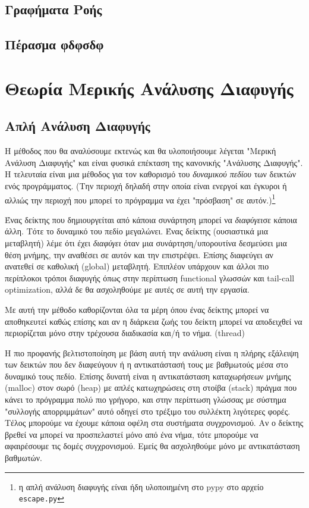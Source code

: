 \subsection{Γραφήματα Ροής}
\subsection{Πέρασμα φδφσδφ}


\section{Θεωρία Μερικής Ανάλυσης Διαφυγής}


\subsection{Απλή Ανάλυση Διαφυγής}

Η μέθοδος που θα αναλύσουμε εκτενώς και θα υλοποιήσουμε λέγεται "Μερική
Ανάλυση Διαφυγής" και είναι φυσικά επέκταση της κανονικής "Ανάλυσης Διαφυγής".
Η τελευταία είναι μια μέθοδος για τον καθορισμό του \textit{δυναμικού πεδίου}
των δεικτών ενός προγράμματος. (Την περιοχή δηλαδή στην οποία είναι ενεργοί
και έγκυροι ή αλλιώς την περιοχή που μπορεί το πρόγραμμα να έχει "πρόσβαση" σε
αυτόν.)\footnote{η απλή ανάλυση διαφυγής είναι ήδη υλοποιημένη στο pypy στο
αρχείο \texttt{escape.py}}

Ένας δείκτης που δημιουργείται από κάποια συνάρτηση μπορεί να
\textit{διαφύγει}σε κάποια άλλη. Τότε το δυναμικό του πεδίο μεγαλώνει. Ένας
δείκτης (ουσιαστικά μια μεταβλητή) λέμε ότι έχει \textit{διαφύγει} όταν μια
συνάρτηση/υπορουτίνα δεσμεύσει μια θέση μνήμης, την αναθέσει σε αυτόν και την
επιστρέψει. Επίσης διαφεύγει αν ανατεθεί σε καθολική (global) μεταβλητή.
Επιπλέον υπάρχουν και άλλοι πιο περίπλοκοι τρόποι διαφυγής όπως στην περίπτωση
functional γλωσσών και tail-call optimization, αλλά δε θα ασχοληθούμε με αυτές
σε αυτή την εργασία.

Με αυτή την μέθοδο καθορίζονται όλα τα μέρη όπου ένας δείκτης μπορεί να
αποθηκευτεί καθώς επίσης και αν η διάρκεια ζωής του δείκτη μπορεί να αποδειχθεί
να περιορίζεται μόνο στην τρέχουσα διαδικασία και/ή το νήμα. (thread)

Η πιο προφανής βελτιστοποίηση με βάση αυτή την ανάλυση είναι η πλήρης εξάλειψη
των δεικτών που δεν διαφεύγουν ή η αντικατάστασή τους με βαθμωτούς μέσα στο
δυναμικό τους πεδίο. Επίσης δυνατή είναι η αντικατάσταση καταχωρήσεων μνήμης
(malloc) στον σωρό (heap) με απλές κατωχηρώσεις στη στοίβα (stack) πράγμα που
κάνει το πρόγραμμα πολύ πιο γρήγορο, και στην περίπτωση γλώσσας με σύστημα
"συλλογής απορριμμάτων" αυτό οδηγεί στο τρέξιμο του συλλέκτη λιγότερες φορές.
Τέλος μπορούμε να έχουμε κάποια οφέλη στα συστήματα συγχρονισμού. Αν ο δείκτης
βρεθεί να μπορεί να προσπελαστεί μόνο από ένα νήμα, τότε μπορούμε να αφαιρέσουμε
τις δομές συγχρονισμού. Εμείς θα ασχοληθούμε μόνο με αντικατάσταση βαθμωτών.


